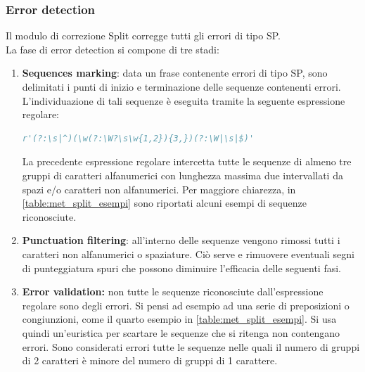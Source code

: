 \subsubsection{Error detection}
\label{sec:met_split_errdet}
Il modulo di correzione Split corregge tutti gli errori di tipo SP.\\
La fase di error detection si compone di tre stadi:
\begin{enumerate}
\item \textbf{Sequences marking}: data un frase contenente errori di tipo SP, sono delimitati i punti di inizio e terminazione delle sequenze contenenti errori. L'individuazione di tali sequenze è eseguita tramite la seguente espressione regolare:
\begin{lstlisting}[language=Python]
r'(?:\s|^)(\w(?:\W?\s\w{1,2}){3,})(?:\W|\s|$)'
\end{lstlisting}
La precedente espressione regolare intercetta tutte le sequenze di almeno tre gruppi di caratteri alfanumerici con lunghezza massima due intervallati da spazi e/o caratteri non alfanumerici. Per maggiore chiarezza, in \autoref{table:met_split_esempi} sono riportati alcuni esempi di sequenze riconosciute.

\item \textbf{Punctuation filtering}: all'interno delle sequenze vengono rimossi tutti i caratteri non alfanumerici o spaziature. Ciò serve e rimuovere eventuali segni di punteggiatura spuri che possono diminuire l'efficacia delle seguenti fasi.

\item \textbf{Error validation:} non tutte le sequenze riconosciute dall'espressione regolare sono degli errori. Si pensi ad esempio ad una serie di preposizioni o congiunzioni, come il quarto esempio in \autoref{table:met_split_esempi}. Si usa quindi un'euristica per scartare le sequenze che si ritenga non contengano errori. Sono considerati errori tutte le sequenze nelle quali il numero di gruppi di 2 caratteri è minore del numero di gruppi di 1 carattere.

\end{enumerate}


